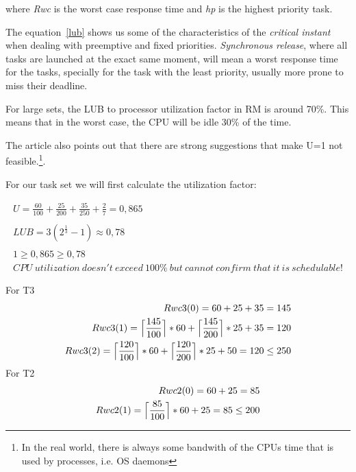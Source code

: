 \documentclass[11pt]{article}
\begin{document}
{\small where \emph{Rwc} is the worst case response time and \emph{hp} is the highest priority task.}
\medskip
\medskip

The equation~\ref{lub} shows us some of the characteristics of the \emph{critical instant} when dealing with preemptive and fixed priorities. \emph {Synchronous release}, where all tasks are launched at the exact same moment, will mean a worst response time for the tasks, specially for the task with the least priority, usually more prone to miss their deadline.

For large sets, the LUB to processor utilization factor in RM is around 70\%. This means that in the worst case, the CPU will be idle 30\% of the time.

The article also points out that there are strong suggestions that make U=1 not feasible.\footnote{In the real world, there is always some bandwith of the CPUs time that is used by processes, i.e. OS daemons}. 


For our task set  we will first calculate the utilization factor:

\begin{equation} 
\begin{split}
	U = \frac{60}{100} + \frac{25}{200} + \frac{35}{250} + \frac{2}{7} = 0,865
	\\
	\\
	LUB = 3(2^ \frac{1}{3} - 1) \approx 0,78
	\\
	\\
	1 \geq  0,865 \geq 0,78
	\\
	CPU\ utilization\ doesn't\ exceed\ 100\%\ but\ cannot\ confirm\ that\ it\ is\ schedulable!
\end{split}
\end{equation}

\noindent
For T3
\begin{equation} 
\begin{split}
	Rwc3(0) = 60 + 25 + 35 = 145
	\\
	Rwc3(1) =  \Bigl\lceil\dfrac{145}{100}\Bigr\rceil * 60 + \Bigl\lceil\dfrac{145}{200}\Bigr\rceil * 25 + 35 = 120
	\\
	Rwc3(2) =  \Bigl\lceil\dfrac{120}{100}\Bigr\rceil * 60 + \Bigl\lceil\dfrac{120}{200}\Bigr\rceil * 25 + 50 = 120 \leq 250
\end{split}
\end{equation}
For T2
\begin{equation} 
\begin{split}
	Rwc2(0) = 60 + 25  = 85
	\\
	Rwc2(1) =  \Bigl\lceil\dfrac{85}{100}\Bigr\rceil * 60 + 25 = 85 \leq 200
\end{split}
\end{equation}
\end{document}
